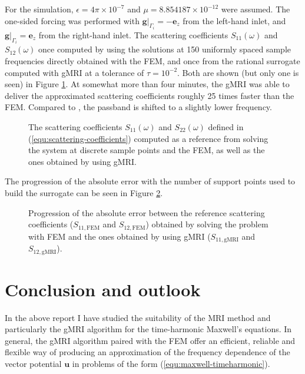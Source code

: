 \documentclass[11pt, a4paper]{article}
\begin{document}
For the simulation, $\epsilon = 4 \pi \times 10^{-7}$ and 
$\mu = 8.854187 \times 10^{-12}$ were assumed. The one-sided forcing
was performed with $\left.\mathbf{g}\right|_{\Gamma_i} = - \mathbf{e}_z$ from the
left-hand inlet, and $\left.\mathbf{g}\right|_{\Gamma_i} = \mathbf{e}_z$ from the
right-hand inlet. The scattering coefficients $S_{11}(\omega)$ and $S_{12}(\omega)$
once computed by using the solutions at 150 uniformly spaced sample frequencies
directly obtained with the \acrshort{FEM},
and once from the rational surrogate computed with \acrshort{gMRI} at a tolerance
of $\tau = 10^{-2}$. Both are shown (but only one is seen) in Figure
\ref{fig:circular-waveguide-scattering}. At somewhat more than four minutes,
the \acrshort{gMRI} was able to deliver the approximated scattering coefficients
roughly 25 times faster than the \acrshort{FEM}. Compared to \cite{DMCWF-FrequencySweep},
the passband is shifted to a slightly lower frequency.

\begin{figure}[ht]
    \centering
    
    \caption{The scattering coefficients $S_11(\omega)$ and $S_22(\omega)$
    defined in (\ref{equ:scattering-coefficients}) computed as a reference
    from solving the system at discrete sample points and the
    \acrshort{FEM}, as well as the ones obtained by using \acrshort{gMRI}.}
    \label{fig:circular-waveguide-scattering}
\end{figure}

The progression of the
absolute error with the number of support points used to build the surrogate
can be seen in Figure \ref{fig:circular-waveguide-error}.

\begin{figure}[ht]
    \centering
    
    \caption{Progression of the absolute error between the reference scattering
    coefficients ($S_{11, \textrm{FEM}}$ and $S_{12, \textrm{FEM}}$) obtained by solving the problem with \acrshort{FEM} and the 
    ones obtained by using \acrshort{gMRI} ($S_{11, \textrm{gMRI}}$ and $S_{12, \textrm{gMRI}}$).}
    \label{fig:circular-waveguide-error}
\end{figure}

\clearpage
\newpage
\section{Conclusion and outlook}
\label{sec:conclusion}

In the above report I have studied the suitability of the \acrfull{MRI} method and
particularly the \acrfull{gMRI} algorithm for the time-harmonic Maxwell's equations.
In general, the \acrshort{gMRI} algorithm paired with the \acrfull{FEM} 
offer an efficient, reliable and flexible way of producing an approximation 
of the frequency dependence of the vector potential $\mathbf{u}$ in problems
of the form (\ref{equ:maxwell-timeharmonic}).
\end{document}
